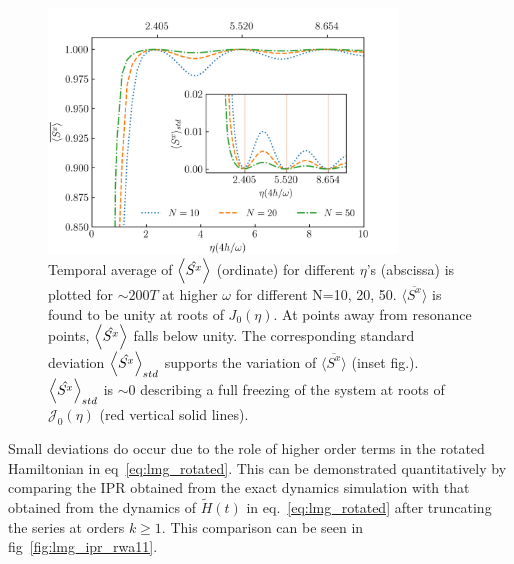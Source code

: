 \documentclass[%
reprint,
superscriptaddress,
linenumbers,
amsmath,amssymb,
aps,
prb,
showkeys,
]{revtex4-2}
\begin{document}
	\begin{figure}[t!]
		\centering
		\includegraphics[width=9.3cm]{sx_conservation.jpeg }
		\caption{Temporal average of $\expval{\hat{S^x}}$ (ordinate) for different $\eta$'s (abscissa) is plotted for $\sim 200T$ at higher $\omega$ for different N=10, 20, 50. $\overline{\langle S^x \rangle}$ is found to be unity at roots of $J_0(\eta)$. At points away from resonance points, $\expval{\hat{S^x}}$ falls below unity. The corresponding standard deviation $\expval{\hat{S^x}}_{std}$ supports the variation of $\overline{\langle S^x \rangle}$ (inset fig.). $\expval{\hat{S^x}}_{std}$ is $\sim 0$ describing a full freezing of the system at roots of $\mathcal{J}_0(\eta)$ (red vertical solid lines).}
		\label{fig:sx_conserve}
	\end{figure}
	Small deviations do occur due to the role of  higher order terms in the rotated Hamiltonian in eq~\ref{eq:lmg_rotated}. This can be demonstrated quantitatively by comparing the IPR obtained from the exact dynamics simulation with that obtained from the dynamics of $\tilde{H}(t)$ in eq.~\ref{eq:lmg_rotated} after truncating the series at orders $k\geq 1$. This comparison can be seen in fig~\ref{fig:lmg_ipr_rwa11}.
\end{document}
